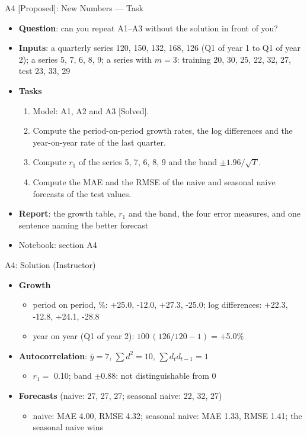\begin{frame}{A4 [Proposed]: New Numbers --- Task}
\itemsize{\footnotesize}
\begin{itemize}
\item \textbf{Question}: can you repeat A1--A3 without the solution in front of you?
\item \textbf{Inputs}: a quarterly series 120, 150, 132, 168, 126 (Q1 of year 1 to Q1 of year 2); a series 5, 7, 6, 8, 9; a series with $m = 3$: training 20, 30, 25, 22, 32, 27, test 23, 33, 29
\item \textbf{Tasks}
\begin{enumerate}
    \item Model: A1, A2 and A3 [Solved].
    \item Compute the period-on-period growth rates, the log differences and the year-on-year rate of the last quarter.
    \item Compute $r_1$ of the series 5, 7, 6, 8, 9 and the band $\pm 1.96/\sqrt T$.
    \item Compute the MAE and the RMSE of the naive and seasonal naive forecasts of the test values.
\end{enumerate}
\item \textbf{Report}: the growth table, $r_1$ and the band, the four error measures, and one sentence naming the better forecast
\item Notebook: section A4
\end{itemize}
\end{frame}

\ifsolutions
\begin{frame}{A4: Solution (Instructor)}
\itemsize{\footnotesize}
\begin{itemize}
    \item \textbf{Growth}
    \begin{itemize}
        \item period on period, \%: $+$25.0, -12.0, $+$27.3, -25.0; log differences: $+$22.3, -12.8, $+$24.1, -28.8
        \item year on year (Q1 of year 2): $100\,(126/120 - 1) = +$5.0\%
    \end{itemize}
    \item \textbf{Autocorrelation}: $\bar y = 7$, $\sum d^2 = 10$, $\sum d_t d_{t-1} = 1$
    \begin{itemize}
        \item $r_1 = $ 0.10; band $\pm$0.88: not distinguishable from 0
    \end{itemize}
    \item \textbf{Forecasts} (naive: 27, 27, 27; seasonal naive: 22, 32, 27)
    \begin{itemize}
        \item naive: MAE 4.00, RMSE 4.32; seasonal naive: MAE 1.33, RMSE 1.41; the seasonal naive wins
    \end{itemize}
\end{itemize}
\end{frame}
\fi

